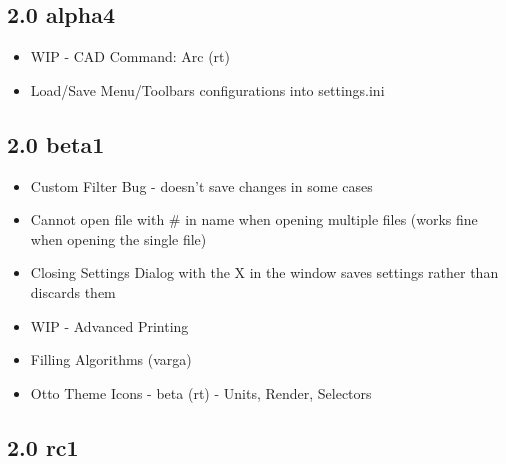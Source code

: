 \documentclass[a4paper]{report}
\begin{document}
\subsection{2.0 alpha4}

\begin{itemize}
\item WIP - CAD Command: Arc (rt)
\item Load/Save Menu/Toolbars configurations into settings.ini
\end{itemize}

\subsection{2.0 beta1}

\begin{itemize}
\item Custom Filter Bug - doesn't save changes in some cases
\item Cannot open file with \# in name when opening multiple files (works fine when opening the single file)
\item Closing Settings Dialog with the X in the window saves settings rather than discards them
\item WIP - Advanced Printing
\item Filling Algorithms (varga)
\item Otto Theme Icons - beta (rt) - Units, Render, Selectors
\end{itemize}

\subsection{2.0 rc1}
\end{document}
